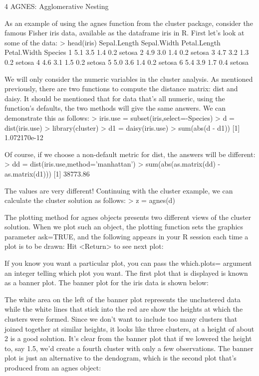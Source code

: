 {4  AGNES: Agglomerative Nesting

As an example of using the agnes function from the cluster package, consider the famous Fisher iris data, available as the dataframe iris in R. First let's look at some of the data:
> head(iris)
  Sepal.Length Sepal.Width Petal.Length Petal.Width Species
1          5.1         3.5          1.4         0.2  setosa
2          4.9         3.0          1.4         0.2  setosa
3          4.7         3.2          1.3         0.2  setosa
4          4.6         3.1          1.5         0.2  setosa
5          5.0         3.6          1.4         0.2  setosa
6          5.4         3.9          1.7         0.4  setosa

We will only consider the numeric variables in the cluster analysis. As mentioned previously, there are two functions to compute the distance matrix: dist and daisy. It should be mentioned that for data that's all numeric, using the function's defaults, the two methods will give the same answers. We can demonstrate this as follows:
> iris.use = subset(iris,select=-Species)
> d = dist(iris.use)
> library(cluster)
> d1 = daisy(iris.use)
> sum(abs(d - d1))
[1] 1.072170e-12

Of course, if we choose a non-default metric for dist, the answers will be different:
> dd = dist(iris.use,method='manhattan')
> sum(abs(as.matrix(dd) - as.matrix(d1)))
[1] 38773.86

The values are very different!
Continuing with the cluster example, we can calculate the cluster solution as follows:
> z = agnes(d)

The plotting method for agnes objects presents two different views of the cluster solution. When we plot such an object, the plotting function sets the graphics parameter ask=TRUE, and the following appears in your R session each time a plot is to be drawn:
Hit <Return> to see next plot: 

If you know you want a particular plot, you can pass the which.plots= argument an integer telling which plot you want.
The first plot that is displayed is known as a banner plot. The banner plot for the iris data is shown below:

The white area on the left of the banner plot represents the unclustered data while the white lines that stick into the red are show the heights at which the clusters were formed. Since we don't want to include too many clusters that joined together at similar heights, it looks like three clusters, at a height of about 2 is a good solution. It's clear from the banner plot that if we lowered the height to, say 1.5, we'd create a fourth cluster with only a few observations.
The banner plot is just an alternative to the dendogram, which is the second plot that's produced from an agnes object:

}
